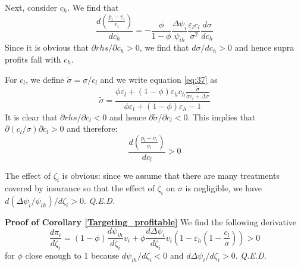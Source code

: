 \documentclass[12pt,english,a4paper]{article}
\newcommand{\qed}{\hspace*{\fill} {\em Q.E.D.}}
\begin{document}
Next, consider \(c_h\). We find that
\begin{equation}
\label{eq:57}
\frac{d\left(\frac{p_i-v_i}{v_i} \right)}{d c_h} = - \frac{\phi}{1-\phi} \frac{\Delta \psi_i}{\psi_{ih}} \frac{\varepsilon_l c_l}{\sigma^2} \frac{d\sigma}{d c_h}
\end{equation}
Since it is obvious that \(\partial rhs/\partial c_h >0\), we find that \(d\sigma/dc_h>0\) and hence supra profits fall with \(c_h\).

For \(c_l\), we define \(\tilde \sigma = \sigma/c_l\) and we write equation \eqref{eq:37} as
\begin{equation}
\label{eq:64}
\tilde \sigma = \frac{\phi \varepsilon_l +(1-\phi) \varepsilon_h c_h \frac{\tilde \sigma}{\tilde \sigma c_l + \Delta \sigma} }{\phi \varepsilon_l +(1-\phi) \varepsilon_h-1}
\end{equation}
It is clear that \(\partial rhs/\partial c_l <0\) and hence \(\partial \tilde \sigma /\partial c_l <0\). This implies that \(\partial (c_l/\sigma)\partial c_l > 0\) and therefore:
\begin{equation}
\label{eq:65}
\frac{d\left(\frac{p_i-v_i}{v_i} \right)}{dc_l} >0
\end{equation}

The effect of \(\zeta_i\) is obvious: since we assume that there are many treatments covered by insurance so that the effect of \(\zeta_i\) on \(\sigma\) is negligible, we have \(d(\Delta\psi_i/\psi_{ih})/d\zeta_i>0\). 
 \qed

\textbf{Proof of Corollary \ref{Targeting_profitable}}
We find the following derivative
\begin{equation}
\label{eq:66}
\frac{d \pi_i}{d \zeta_i} = (1-\phi) \frac{d \psi_{ih}}{d\zeta_i} v_i+\phi \frac{d\Delta\psi_i}{d\zeta_i}v_i (1-\varepsilon_h(1-\frac{c_l}{\sigma})) > 0
\end{equation}
for \(\phi\) close enough to 1 because \(d\psi_{ih}/d\zeta_{i}<0\) and \(d\Delta\psi_i/d\zeta_i>0\). 
 \qed
\end{document}
